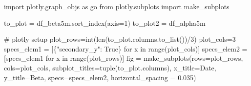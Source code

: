 \documentclass[
  letterpaper,
  DIV=11,
  numbers=noendperiod]{scrartcl}
\newenvironment{Shaded}{\begin{snugshade}}{\end{snugshade}}
\newcommand{\BuiltInTok}[1]{\textcolor[rgb]{0.00,0.23,0.31}{#1}}
\newcommand{\CommentTok}[1]{\textcolor[rgb]{0.37,0.37,0.37}{#1}}
\newcommand{\ControlFlowTok}[1]{\textcolor[rgb]{0.00,0.23,0.31}{#1}}
\newcommand{\DecValTok}[1]{\textcolor[rgb]{0.68,0.00,0.00}{#1}}
\newcommand{\FloatTok}[1]{\textcolor[rgb]{0.68,0.00,0.00}{#1}}
\newcommand{\ImportTok}[1]{\textcolor[rgb]{0.00,0.46,0.62}{#1}}
\newcommand{\KeywordTok}[1]{\textcolor[rgb]{0.00,0.23,0.31}{#1}}
\newcommand{\NormalTok}[1]{\textcolor[rgb]{0.00,0.23,0.31}{#1}}
\newcommand{\OperatorTok}[1]{\textcolor[rgb]{0.37,0.37,0.37}{#1}}
\newcommand{\StringTok}[1]{\textcolor[rgb]{0.13,0.47,0.30}{#1}}
\newcommand{\VariableTok}[1]{\textcolor[rgb]{0.07,0.07,0.07}{#1}}
\begin{document}
\begin{Shaded}
\begin{Highlighting}[]
\ImportTok{import}\NormalTok{ plotly.graph\_objs }\ImportTok{as}\NormalTok{ go}
\ImportTok{from}\NormalTok{ plotly.subplots }\ImportTok{import}\NormalTok{ make\_subplots}

\NormalTok{to\_plot }\OperatorTok{=}\NormalTok{ df\_beta5m.sort\_index(axis}\OperatorTok{=}\DecValTok{1}\NormalTok{)}
\NormalTok{to\_plot2 }\OperatorTok{=}\NormalTok{ df\_alpha5m}

\CommentTok{\# plotly setup}
\NormalTok{plot\_rows}\OperatorTok{=}\BuiltInTok{int}\NormalTok{(}\BuiltInTok{len}\NormalTok{(to\_plot.columns.to\_list())}\OperatorTok{/}\DecValTok{3}\NormalTok{)}
\NormalTok{plot\_cols}\OperatorTok{=}\DecValTok{3}
\NormalTok{specs\_elem1 }\OperatorTok{=}\NormalTok{ [\{}\StringTok{"secondary\_y"}\NormalTok{: }\VariableTok{True}\NormalTok{\} }\ControlFlowTok{for}\NormalTok{ x }\KeywordTok{in} \BuiltInTok{range}\NormalTok{(plot\_cols)]}
\NormalTok{specs\_elem2 }\OperatorTok{=}\NormalTok{ [specs\_elem1 }\ControlFlowTok{for}\NormalTok{ x }\KeywordTok{in} \BuiltInTok{range}\NormalTok{(plot\_rows)]}
\NormalTok{fig }\OperatorTok{=}\NormalTok{ make\_subplots(rows}\OperatorTok{=}\NormalTok{plot\_rows, cols}\OperatorTok{=}\NormalTok{plot\_cols, subplot\_titles}\OperatorTok{=}\BuiltInTok{tuple}\NormalTok{(to\_plot.columns),}
\NormalTok{                    x\_title}\OperatorTok{=}\StringTok{\textquotesingle{}Date\textquotesingle{}}\NormalTok{,}
\NormalTok{                    y\_title}\OperatorTok{=}\StringTok{\textquotesingle{}Beta\textquotesingle{}}\NormalTok{, }
\NormalTok{                    specs}\OperatorTok{=}\NormalTok{specs\_elem2, horizontal\_spacing }\OperatorTok{=} \FloatTok{0.035}\NormalTok{)}


\end{Highlighting}
\end{Shaded}
\end{document}
